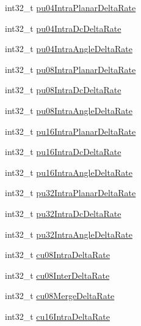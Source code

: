 \begin{DoxyCompactItemize}
int32\+\_\+t \mbox{\hyperlink{struct__ni__t408__config__t_a93475bd4b52bcead6869bf5379a46e83}{pu04\+Intra\+Planar\+Delta\+Rate}}
\item 
int32\+\_\+t \mbox{\hyperlink{struct__ni__t408__config__t_a6e4b90cba815c84204a7a72391c79b15}{pu04\+Intra\+Dc\+Delta\+Rate}}
\item 
int32\+\_\+t \mbox{\hyperlink{struct__ni__t408__config__t_a7342e12a9bcee0daedf452ac3ba68724}{pu04\+Intra\+Angle\+Delta\+Rate}}
\item 
int32\+\_\+t \mbox{\hyperlink{struct__ni__t408__config__t_a7854ba029610d240a307d7062c049bc6}{pu08\+Intra\+Planar\+Delta\+Rate}}
\item 
int32\+\_\+t \mbox{\hyperlink{struct__ni__t408__config__t_a52e19be7fe3179903aad98c9b8cab70b}{pu08\+Intra\+Dc\+Delta\+Rate}}
\item 
int32\+\_\+t \mbox{\hyperlink{struct__ni__t408__config__t_a12d264dcbb6ef57bbb71bf2580e59acb}{pu08\+Intra\+Angle\+Delta\+Rate}}
\item 
int32\+\_\+t \mbox{\hyperlink{struct__ni__t408__config__t_a8a6f8bd9f01d7ad5fc1ab680628b9b1f}{pu16\+Intra\+Planar\+Delta\+Rate}}
\item 
int32\+\_\+t \mbox{\hyperlink{struct__ni__t408__config__t_a16b2591ea7834c567480a458550af6f5}{pu16\+Intra\+Dc\+Delta\+Rate}}
\item 
int32\+\_\+t \mbox{\hyperlink{struct__ni__t408__config__t_a74fedc2585cafbacf70babe0a91d9cbb}{pu16\+Intra\+Angle\+Delta\+Rate}}
\item 
int32\+\_\+t \mbox{\hyperlink{struct__ni__t408__config__t_aff6047e07afdefc0659c944956cd61c9}{pu32\+Intra\+Planar\+Delta\+Rate}}
\item 
int32\+\_\+t \mbox{\hyperlink{struct__ni__t408__config__t_aed18a45e2b9d66e5bd674f527442dba2}{pu32\+Intra\+Dc\+Delta\+Rate}}
\item 
int32\+\_\+t \mbox{\hyperlink{struct__ni__t408__config__t_acc2267a6c7acc757c7fa540cc547a9cb}{pu32\+Intra\+Angle\+Delta\+Rate}}
\item 
int32\+\_\+t \mbox{\hyperlink{struct__ni__t408__config__t_adcc9dec0bbaca9f29b1c22881d6172ef}{cu08\+Intra\+Delta\+Rate}}
\item 
int32\+\_\+t \mbox{\hyperlink{struct__ni__t408__config__t_aeaefbdd841a5139d1977a350b2a8b93f}{cu08\+Inter\+Delta\+Rate}}
\item 
int32\+\_\+t \mbox{\hyperlink{struct__ni__t408__config__t_a2a32547e59bbd660fda362ec631813dc}{cu08\+Merge\+Delta\+Rate}}
\item 
int32\+\_\+t \mbox{\hyperlink{struct__ni__t408__config__t_ad199ac0711218333065351a03d5680c5}{cu16\+Intra\+Delta\+Rate}}

\end{DoxyCompactItemize}
